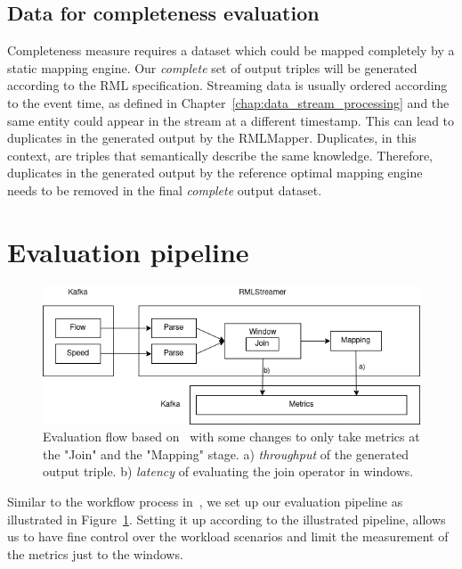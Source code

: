 \subsection{Data for completeness evaluation}
Completeness measure requires a dataset which could be mapped completely by a static 
mapping engine. 
Our \emph{complete} set of output triples will be generated according 
to the RML specification. Streaming data is usually 
ordered according to the event time, as defined in Chapter~\ref{chap:data_stream_processing} 
and the same entity could appear in the 
stream at a different timestamp. This can lead to duplicates in the generated output by 
the RMLMapper. Duplicates, in this context, are triples that semantically describe the 
same knowledge. Therefore, duplicates in the generated output by the reference optimal
mapping engine needs to be removed in the final \emph{complete} output dataset.

\section{Evaluation pipeline}

\begin{figure}[!htbp]
    \centering
    \includegraphics[width=\textwidth]{fig/evaluation_architecture.png}
    \caption{Evaluation flow based on~\cite{evalution_of_spe} with some changes to only 
    take metrics at the "Join" and the "Mapping" stage. a) \emph{throughput} of the generated output triple. 
    b) \emph{latency} of evaluating the join operator in windows.}
    \label{fig:evaluation_flow}
    
\end{figure}

Similar to the workflow process in~\cite{evalution_of_spe, benchmark_sce}, we set up
our evaluation pipeline as illustrated in Figure~\ref{fig:evaluation_flow}. Setting it 
up according to the illustrated pipeline, allows us to have fine control over the 
workload scenarios and limit the measurement of the metrics just to the windows. 




